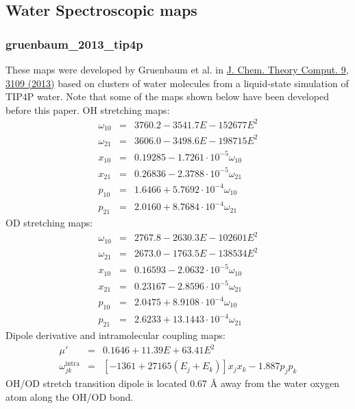 \documentclass{article}
\begin{document}
\subsection{\label{sec:wmaps}Water Spectroscopic maps}
\subsubsection{gruenbaum\_2013\_tip4p}
These maps were developed by Gruenbaum et al. in \href{https://pubs.acs.org/doi/10.1021/ct400292q}{J. Chem. Theory Comput. 9, 3109 (2013)} based on clusters
of water molecules from a liquid-state simulation of TIP4P water. Note that some of the maps shown below have been
developed before this paper.
OH stretching maps:
\begin{eqnarray}
\omega_{10} &=& 3760.2 - 3541.7E-152677E^2 \nonumber\\
\omega_{21} &=& 3606.0 - 3498.6E - 198715E^2 \nonumber \\
x_{10} &=& 0.19285 - 1.7261\cdot 10^{-5} \omega_{10} \nonumber \\
x_{21} &=& 0.26836 - 2.3788\cdot 10^{-5} \omega_{21} \nonumber \\
p_{10} &=& 1.6466 + 5.7692\cdot 10^{-4} \omega_{10} \nonumber \\
p_{21} &=& 2.0160 + 8.7684\cdot 10^{-4} \omega_{21} \nonumber 
\end{eqnarray}
OD stretching maps:
\begin{eqnarray}
\omega_{10} &=& 2767.8 - 2630.3E-102601E^2 \nonumber\\
\omega_{21} &=& 2673.0 - 1763.5E - 138534E^2 \nonumber \\
x_{10} &=& 0.16593 - 2.0632\cdot 10^{-5} \omega_{10} \nonumber \\
x_{21} &=& 0.23167 - 2.8596\cdot 10^{-5} \omega_{21} \nonumber \\
p_{10} &=& 2.0475 + 8.9108\cdot 10^{-4} \omega_{10} \nonumber \\
p_{21} &=& 2.6233 + 13.1443\cdot 10^{-4} \omega_{21} \nonumber 
\end{eqnarray}
Dipole derivative and intramolecular coupling maps:
\begin{eqnarray}
\mu' &=& 0.1646 + 11.39E + 63.41E^2 \nonumber \\
\omega_{jk}^\text{intra}&=& [-1361 + 27165(E_j + E_k)]x_jx_k - 1.887 p_j p_k \nonumber
\end{eqnarray}
OH/OD stretch transition dipole is located 0.67 \AA{} away from the water oxygen atom along the OH/OD bond.
\end{document}
